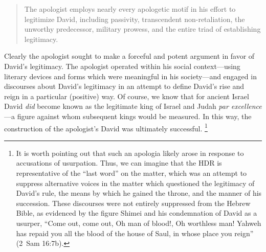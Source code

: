 \begin{quote}
    The apologist employs nearly every apologetic motif in his effort to legitimize David, including passivity, transcendent non-retaliation, the unworthy predecessor, military prowess, and the entire triad of establishing legitimacy.%
    \autocite{knapp2015}
\end{quote}

Clearly the apologist sought to make a forceful and potent argument in
favor of David's legitimacy. The apologist operated within his social context---using literary devices and forms which were meaningful in his society---and engaged in discourses about David's legitimacy in an attempt to define David's rise and reign in a particular (positive) way. Of course, we know that for ancient Israel David \emph{did} become known as the legitimate king of Israel and Judah \emph{par excellence}---a figure against whom subsequent kings would be measured. In this way, the construction of the apologist's David was ultimately successful.%
    \footnote{It is worth pointing out that such an apologia likely arose in response to accusations of usurpation. Thus, we can imagine that the HDR is representative of the ``last word'' on the matter, which was an attempt to suppress alternative voices in the matter which questioned the legitimacy of David's rule, the means by which he gained the throne, and the manner of his succession. These discourses were not entirely suppressed from the Hebrew Bible, as evidenced by the figure Shimei and his condemnation of David as a usurper, ``Come out, come out, Oh man of blood!, Oh worthless man! Yahweh has repaid you all the blood of the house of Saul, in whose place you reign'' (2~Sam 16:7b).}

